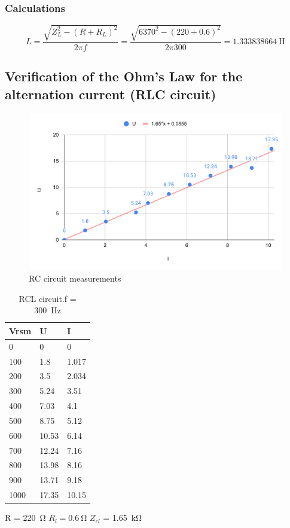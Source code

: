 \subsubsection*{Calculations}

\begin{equation}
	L = \frac{\sqrt{Z_L^2-(R+R_L)^2}}{2\pi f} = 
	\frac{\sqrt{6370^2-(220+0.6)^2}}{2\pi 300} =
	\SI{1.333838664}{\henry}
\end{equation}



\subsection{Verification of the Ohm's Law for the alternation current (RLC circuit)}

\begin{figure}[H]
	\centering
	\includegraphics[width= 14cm]{schematics/verification.pdf}
	\caption{RC circuit measurements }
	\label{fig:verification}
\end{figure}

\begin{table}[!ht]
    \centering
    \begin{tabular}{l|l|l}
        Vrsm & U & I \\ \hline
        0 & 0 & 0 \\ 
        100 & 1.8 & 1.017 \\ 
        200 & 3.5 & 2.034 \\ 
        300 & 5.24 & 3.51 \\ 
        400 & 7.03 & 4.1 \\ 
        500 & 8.75 & 5.12 \\ 
        600 & 10.53 & 6.14 \\ 
        700 & 12.24 & 7.16 \\ 
        800 & 13.98 & 8.16 \\ 
        900 & 13.71 & 9.18 \\ 
        1000 & 17.35 & 10.15 \\ 
    \end{tabular}
    \caption{RCL circuit.f = \SI{300}{\hertz}} R = \SI{220}{\ohm} $R_l = \SI{0.6}{\ohm}$ $Z_{cl}$ = \SI{1.65}{\kilo\ohm}
    \label{tab:verification}
    \end{table}
    

